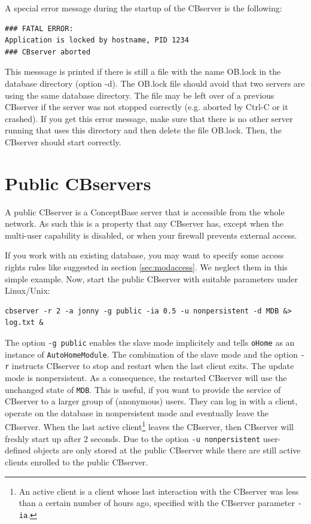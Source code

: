 A special error message during the startup of the CBserver
is the following:
\begin{verbatim}
### FATAL ERROR:
Application is locked by hostname, PID 1234 
### CBserver aborted
\end{verbatim}
This messsage is printed if there is still a file with the name OB.lock
in the database directory (option -d). The OB.lock file should avoid that
two servers are using the same database directory. The file may be left over of a previous
CBserver if the server was not stopped correctly (e.g. aborted by Ctrl-C or it crashed).
If you get this error message, make sure that there is no other server running
that uses this directory and then delete the file OB.lock. Then, the 
CBserver should start correctly.


\section{Public CBservers}
\label{sec:pubcbserver}

A public CBserver is a ConceptBase server that is accessible from 
the whole network. As such this is a property that any CBserver has, except when
the multi-user capability is disabled, or when your firewall prevents
external access.

If you work with an existing database, you may want to specify some access rights rules like suggested in section \ref{sec:modaccess}.
We neglect them in this simple example.
Now, start the public CBserver with suitable parameters under Linux/Unix:

{\small
\begin{verbatim}
cbserver -r 2 -a jonny -g public -ia 0.5 -u nonpersistent -d MDB &> log.txt &
\end{verbatim}
}

The option {\tt -g public} enables the slave mode implicitely and tells {\tt oHome}
as an instance of {\tt Auto\-Home\-Module}. The combination of the slave mode and the
option {\tt -r} instructs CBserver to stop and
restart when the last client exits.
The update mode is nonpersistent. As a consequence, the restarted CBserver
will use the unchanged state of {\tt MDB}. This is useful, if you want to provide
the service of CBserver to a larger group of (anonymous) users. They can log in
with a client, operate on the database in nonpersistent mode and eventually leave
the CBserver. When the last active client\footnote{An active client is a client 
whose last interaction with the CBserver was less than a certain
number of hours ago, specified with the CBserver parameter {\tt -ia}.}
leaves the CBserver, then CBserver will freshly start up
after 2 seconds. Due to the option {\tt -u nonpersistent}
user-defined objects are only stored at the public CBserver
while there are still active clients enrolled to the public CBserver. 

